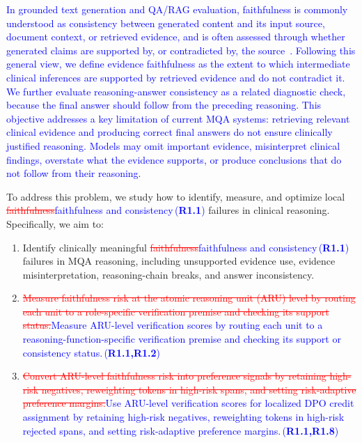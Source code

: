 \documentclass[a4paper,fleqn,doubleblind]{cas-sc}
\DeclareRobustCommand{\deleted}[1]{\textcolor{red}{\sout{#1}}}
\DeclareRobustCommand{\added}[1]{\textcolor{blue}{#1}}
\DeclareRobustCommand{\revtag}[1]{\textcolor{blue}{\scriptsize\,(\textbf{#1})}}
\begin{document}
\added{In grounded text generation and QA/RAG evaluation, faithfulness is commonly understood as consistency between generated content and its input source, document context, or retrieved evidence, and is often assessed through whether generated claims are supported by, or contradicted by, the source~\cite{maynez-etal-2020-faithfulness,adlakha2024evaluating,saadfalcon2024ares}.}
\added{Following this general view, we define evidence faithfulness as the extent to which intermediate clinical inferences are supported by retrieved evidence and do not contradict it.}
\added{We further evaluate reasoning-answer consistency as a related diagnostic check, because the final answer should follow from the preceding reasoning.}
\added{This objective addresses a key limitation of current MQA systems: retrieving relevant clinical evidence and producing correct final answers do not ensure clinically justified reasoning.}
\added{Models may omit important evidence, misinterpret clinical findings, overstate what the evidence supports, or produce conclusions that do not follow from their reasoning.}

To address this problem, we study how to identify, measure, and optimize local \deleted{faithfulness}\added{faithfulness and consistency}\revtag{R1.1} failures in clinical reasoning.
Specifically, we aim to:
\begin{enumerate}[label=(\arabic*), noitemsep]
\item Identify clinically meaningful \deleted{faithfulness}\added{faithfulness and consistency}\revtag{R1.1} failures in MQA reasoning, including unsupported evidence use, evidence misinterpretation, reasoning-chain breaks, and answer inconsistency.
\item \deleted{Measure faithfulness risk at the atomic reasoning unit (ARU) level by routing each unit to a role-specific verification premise and checking its support status.}\added{Measure ARU-level verification scores by routing each unit to a reasoning-function-specific verification premise and checking its support or consistency status.}\revtag{R1.1,R1.2}
\item \deleted{Convert ARU-level faithfulness risk into preference signals by retaining high-risk negatives, reweighting tokens in high-risk spans, and setting risk-adaptive preference margins.}\added{Use ARU-level verification scores for localized DPO credit assignment by retaining high-risk negatives, reweighting tokens in high-risk rejected spans, and setting risk-adaptive preference margins.}\revtag{R1.1,R1.8}
\end{enumerate}
\end{document}
